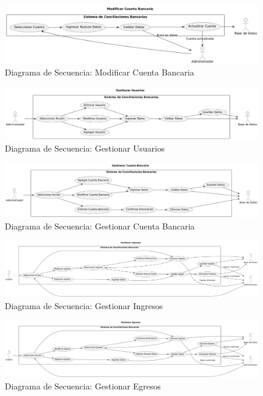 \documentclass{article}
\begin{document}
\begin{figure}[H]
    \centering
    \includegraphics[width=\textwidth]{casos/ModificarCuentaBancaria.png}
    \caption{Diagrama de Secuencia: Modificar Cuenta Bancaria}
\end{figure}

\begin{figure}[H]
    \centering
    \includegraphics[width=\textwidth]{casos/GestionarUsuarios.png}
    \caption{Diagrama de Secuencia: Gestionar Usuarios}
\end{figure}

\begin{figure}[H]
    \centering
    \includegraphics[width=\textwidth]{casos/GestionarCuentaBancaria.png}
    \caption{Diagrama de Secuencia: Gestionar Cuenta Bancaria}
\end{figure}

\begin{figure}[H]
    \centering
    \includegraphics[width=\textwidth]{casos/GestionarIngresos.png}
    \caption{Diagrama de Secuencia: Gestionar Ingresos}
\end{figure}

\begin{figure}[H]
    \centering
    \includegraphics[width=\textwidth]{casos/GestionarEgresos.png}
    \caption{Diagrama de Secuencia: Gestionar Egresos}
\end{figure}
\end{document}
